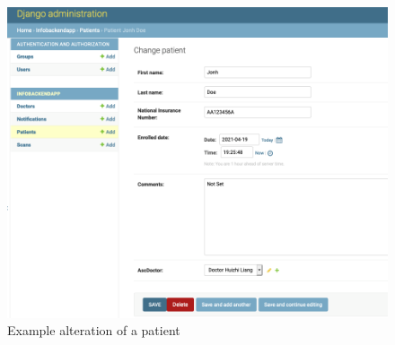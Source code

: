 			\begin{figure}[H]
				\iftrue
				\caption{Example alteration of a patient}
				\centering
				\includegraphics[scale=0.3]{figures/admin-panel-example-2}
				\fi
			\end{figure}
			
		
			
			
			
			
			
			
		
	




